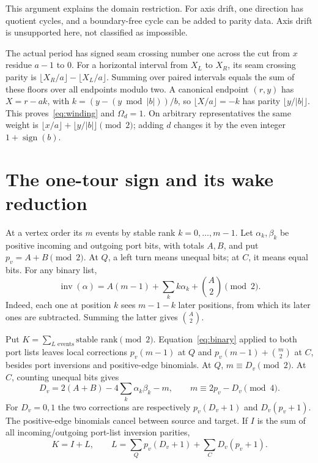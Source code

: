 \documentclass[11pt]{article}
\newcommand{\Od}{\Omega_d}
\newcommand{\inv}{\operatorname{inv}}
\begin{document}
This argument explains the domain restriction. For axis drift, one direction
has quotient cycles, and a boundary-free cycle can be added to parity data.
Axis drift is unsupported here, not classified as impossible.

The actual period has signed seam crossing number one across the cut from
$x$ residue $a-1$ to $0$. For a horizontal interval from $X_L$ to $X_R$, its
seam crossing parity is $\lfloor X_R/a\rfloor-\lfloor X_L/a\rfloor$.
Summing over paired intervals equals the sum of these floors over all endpoints
modulo two. A canonical endpoint $(r,y)$ has $X=r-ak$, with
$k=(y-(y\bmod|b|))/b$, so $\lfloor X/a\rfloor=-k$ has parity
$\lfloor y/|b|\rfloor$. This proves~\eqref{eq:winding} and $\Od=1$.
On arbitrary representatives the same weight is
$\lfloor x/a\rfloor+\lfloor y/|b|\rfloor\pmod2$; adding $d$ changes it by the
even integer $1+\operatorname{sign}(b)$.

\section{The one-tour sign and its wake reduction}
At a vertex order its $m$ events by stable rank $k=0,\ldots,m-1$.
Let $\alpha_k,\beta_k$ be positive incoming and outgoing port bits, with totals
$A,B$, and put $p_v=A+B\pmod2$. At $Q$, a left turn means unequal bits;
at $C$, it means equal bits. For any binary list,
\begin{equation}
 \inv(\alpha)=A(m-1)+\sum_k k\alpha_k+\binom A2\pmod2.
 \label{eq:binary}
\end{equation}
Indeed, each one at position $k$ sees $m-1-k$ later positions, from which its
later ones are subtracted. Summing the latter gives $\binom A2$.

Put $K=\sum_{L\text{ events}}\text{stable rank}\pmod2$.
Equation~\eqref{eq:binary} applied to both port lists leaves local corrections
$p_v(m-1)$ at $Q$ and $p_v(m-1)+\binom m2$ at $C$, besides port inversions and
positive-edge binomials. At $Q$, $m\equiv D_v\pmod2$. At $C$, counting unequal
bits gives
\[
 D_v=2(A+B)-4\sum_k\alpha_k\beta_k-m,
 \qquad m\equiv2p_v-D_v\pmod4.
\]
For $D_v=0,1$ the two corrections are respectively $p_v(D_v+1)$ and
$D_v(p_v+1)$. The positive-edge binomials cancel between source and target.
If $I$ is the sum of all incoming/outgoing port-list inversion parities,
\begin{equation}
 K=I+L,\qquad L=\sum_Qp_v(D_v+1)+\sum_CD_v(p_v+1).\label{eq:local}
\end{equation}
\end{document}
